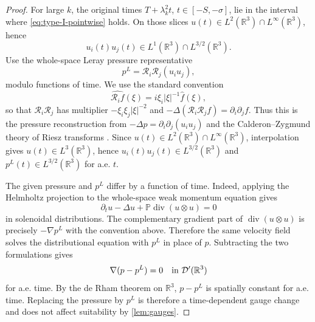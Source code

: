 \documentclass[11pt]{amsart}
\theoremstyle{plain}
\theoremstyle{definition}
\theoremstyle{remark}
\numberwithin{equation}{section}
\newcommand{\R}{\mathbb R}
\newcommand{\divergence}{\operatorname{div}}
\begin{document}
\begin{proof}
For large \(k\), the original times \(T+\lambda_k^2t\), \(t\in[-S,-\sigma]\),
lie in the interval where \eqref{eq:type-I-pointwise} holds.  On those slices
\(u(t)\in L^2(\R^3)\cap L^\infty(\R^3)\), hence
\[
   u_i(t)u_j(t)\in L^1(\R^3)\cap L^{3/2}(\R^3).
\]
Use the whole-space Leray pressure representative
\[
   p^L=\mathcal R_i\mathcal R_j(u_i u_j),
\]
modulo functions of time.  We use the standard convention
\[
   \widehat{\mathcal R_i f}(\xi)=i\xi_i|\xi|^{-1}\widehat f(\xi),
\]
so that \(\mathcal R_i\mathcal R_j\) has multiplier
\(-\xi_i\xi_j|\xi|^{-2}\) and
\(-\Delta(\mathcal R_i\mathcal R_j f)=\partial_i\partial_jf\).  Thus this is
the pressure reconstruction from
\(-\Delta p=\partial_i\partial_j(u_i u_j)\) and the Calderon--Zygmund theory
of Riesz transforms \cite{Stein1970,Sohr2001}.  Since
\(u(t)\in L^2(\R^3)\cap L^\infty(\R^3)\), interpolation gives
\(u(t)\in L^3(\R^3)\), hence \(u_i(t)u_j(t)\in L^{3/2}(\R^3)\) and
\(p^L(t)\in L^{3/2}(\R^3)\) for a.e. \(t\).

The given pressure and \(p^L\) differ by a function of time.  Indeed, applying
the Helmholtz projection to the whole-space weak momentum equation gives
\[
   \partial_tu-\Delta u+\mathbb P\divergence(u\otimes u)=0
\]
in solenoidal distributions.  The complementary gradient part of
\(\divergence(u\otimes u)\) is precisely
\(-\nabla p^L\) with the convention above.  Therefore the same velocity field
solves the distributional equation with \(p^L\) in place of \(p\).  Subtracting
the two formulations gives
\[
   \nabla(p-p^L)=0
   \quad\hbox{in }\mathcal D'(\R^3)
\]
for a.e. time.  By the de Rham theorem on \(\R^3\), \(p-p^L\) is spatially
constant for a.e. time.  Replacing the pressure by \(p^L\) is therefore a
time-dependent gauge change and does not affect suitability by
\cref{lem:gauges}.


\end{proof}
\end{document}
